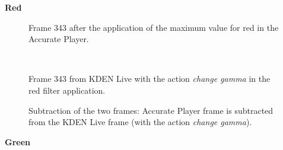 \documentclass[../MasterThesis.tex]{subfiles}
\begin{document}
\vspace*{-0.4em}


\textbf{Red}

\vspace*{-1em}

\begin{minipage}{0.48\textwidth}
	\begin{figure}[H]
		\begin{center}
			\caption[]{\small Frame 343 after the application of the maximum value for red in the Accurate Player.}
		\end{center}
	\end{figure}
\end{minipage}\begin{minipage}{0.04\textwidth}
	\ 
\end{minipage}\begin{minipage}{0.48\textwidth}
	\begin{figure}[H]
		\begin{center}
			\caption[]{\small Frame 343 from KDEN Live with the action \textit{change gamma} in the red filter application.}
		\end{center}
	\end{figure}
\end{minipage}

\vspace*{-1em}

\begin{figure}[H]
	\begin{center}
		\caption[]{\small Subtraction of the two frames: Accurate Player frame is subtracted from the KDEN Live frame (with the action \textit{change gamma}).}
	\end{center}
\end{figure}






\vspace*{-1em}

\textbf{Green}

\vspace*{-1em}
\end{document}
